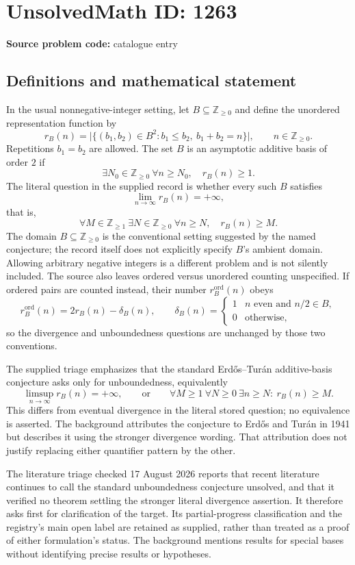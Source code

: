 \documentclass[11pt]{article}
\newcommand{\Z}{\mathbb{Z}}
\begin{document}
\section*{UnsolvedMath ID: 1263}
\textbf{Source problem code:} catalogue entry
\subsection{Definitions and mathematical statement}
In the usual nonnegative-integer setting, let $B\subseteq\Z_{\ge0}$ and define the unordered representation function by
\[
 r_B(n)=\bigl|\{(b_1,b_2)\in B^2:b_1\le b_2,\ b_1+b_2=n\}\bigr|,
 \qquad n\in\Z_{\ge0}.
\]
Repetitions $b_1=b_2$ are allowed. The set $B$ is an asymptotic additive basis of order $2$ if
\[
 \exists N_0\in\Z_{\ge0}\ \forall n\ge N_0,\quad r_B(n)\ge1.
\]
The literal question in the supplied record is whether every such $B$ satisfies
\[
 \lim_{n\to\infty}r_B(n)=+\infty,
\]
that is,
\[
 \forall M\in\Z_{\ge1}\ \exists N\in\Z_{\ge0}\
 \forall n\ge N,\quad r_B(n)\ge M.
\]
The domain $B\subseteq\Z_{\ge0}$ is the conventional setting suggested by the named conjecture; the record itself does not explicitly specify $B$'s ambient domain. Allowing arbitrary negative integers is a different problem and is not silently included. The source also leaves ordered versus unordered counting unspecified. If ordered pairs are counted instead, their number $r_B^{\mathrm{ord}}(n)$ obeys
\[
 r_B^{\mathrm{ord}}(n)=2r_B(n)-\delta_B(n),\qquad
 \delta_B(n)=\begin{cases}1&n\text{ even and }n/2\in B,\\0&\text{otherwise},\end{cases}
\]
so the divergence and unboundedness questions are unchanged by those two conventions.

The supplied triage emphasizes that the standard Erd\H{o}s--Tur\'an additive-basis conjecture asks only for unboundedness, equivalently
\[
 \limsup_{n\to\infty}r_B(n)=+\infty,
 \qquad\text{or}\qquad
 \forall M\ge1\ \forall N\ge0\ \exists n\ge N:\ r_B(n)\ge M.
\]
This differs from eventual divergence in the literal stored question; no equivalence is asserted. The background attributes the conjecture to Erd\H{o}s and Tur\'an in 1941 but describes it using the stronger divergence wording. That attribution does not justify replacing either quantifier pattern by the other.

The literature triage checked 17 August 2026 reports that recent literature continues to call the standard unboundedness conjecture unsolved, and that it verified no theorem settling the stronger literal divergence assertion. It therefore asks first for clarification of the target. Its partial-progress classification and the registry's main open label are retained as supplied, rather than treated as a proof of either formulation's status. The background mentions results for special bases without identifying precise results or hypotheses.
\end{document}
